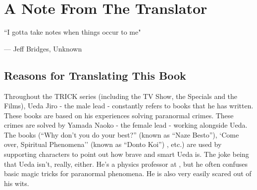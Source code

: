 

\setcounter{footnote}{0}
\setcounter{endnote}{0}

\chapter*{A Note From The Translator}

\epigraph{``I gotta take notes when things occur to me"}{--- \textup{Jeff Bridges}, Unknown}

\section*{Reasons for Translating This Book}


Throughout the TRICK series (including the TV Show, the Specials and the Films), Ueda Jiro - the male lead - constantly refers to books that he has written. These books are based on his experiences solving paranormal crimes. These crimes are solved by Yamada Naoko - the female lead - working alongside Ueda. The books (``Why don't you do your best?'' (known as ``Naze Besto''), `Come over, Spiritual Phenomena'' (known as ``Donto Koi'') , etc.) are used by supporting characters to point out how brave and smart Ueda is. The joke being that Ueda isn't, really, either. He's a physics professor at , but he often confuses basic magic tricks for paranormal phenomena. He is also very easily scared out of his wits.

